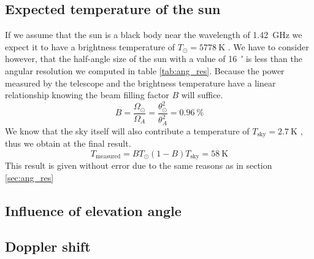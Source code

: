 \subsection{Expected temperature of the sun}\label{sec:temp}
If we assume that the sun is a black body near the wavelength of \SI{1.42}{\giga\hertz} we expect it to have a brightness temperature of $T_{\odot} = \SI{5778}{\kelvin}$ \cite[p. 211]{ftb}.
We have to consider however, that the half-angle size of the sun with a value of \SI{16}{\arcminute} \cite[p. 211]{ftb} is less than the angular resolution we computed in table \ref{tab:ang_res}.
Because the power measured by the telescope and the brightness temperature have a linear relationship knowing the beam filling factor $B$ will suffice.
\begin{equation}
    B = \frac{\Omega_{\odot}}{\Omega_A} = \frac{\theta_{\odot}^2}{\theta_A^2} = \SI{0.96
    }{\percent}
\end{equation}
We know that the sky itself will also contribute a temperature of $T_{\text{sky}} = \SI{2.7}{\kelvin}$ \cite[p. 4]{script}, thus we obtain at the final result.
\begin{equation}
    T_{\text{measured}} = B T_{\odot} (1-B) T_{\text{sky}} = \SI{58}{\kelvin}
\end{equation}
This result is given without error due to the same reasons as in section \ref{sec:ang_res}


\subsection{Influence of elevation angle}

\subsection{Doppler shift}